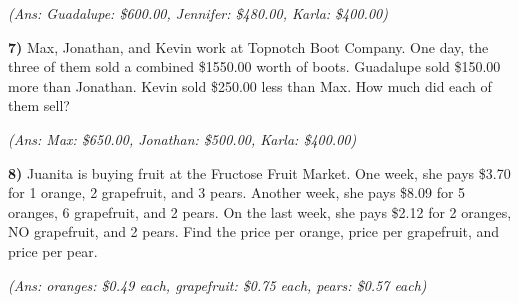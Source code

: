 \documentclass[10pt,letterpaper]{memoir}
\begin{document}
\myWideMatrixTable[-0.1in]

\vspace{0.5in}
\hfill{\itshape (Ans: Guadalupe: \$600.00, Jennifer: \$480.00, Karla: \$400.00)}
\vspace{2em}



\newpage
{\bfseries\large 7)} 
Max, Jonathan, and Kevin work at Topnotch Boot Company.
One day, the three of them sold a combined \$1550.00 worth of boots.
Guadalupe sold \$150.00 more than Jonathan.
Kevin sold \$250.00 less than Max.
How much did each of them sell?

\myWideMatrixTable[-0.1in]

\vspace{0.5in}
\hfill{\itshape (Ans: Max: \$650.00, Jonathan: \$500.00, Karla: \$400.00)}
\vspace{2em}





{\bfseries\large 8)} 
Juanita is buying fruit at the Fructose Fruit Market.
One week, she pays \$3.70 for 1 orange, 2 grapefruit, and 3 pears.
Another week, she pays \$8.09 for 5 oranges, 6 grapefruit, and 2 pears.
On the last week, she pays \$2.12 for 2 oranges, NO grapefruit, and 2 pears.
Find the price per orange, price per grapefruit, and price per pear.


\myWideMatrixTable[-0.1in]

\vspace{0.5in}
\hfill{\itshape (Ans: oranges: \$0.49 each, grapefruit: \$0.75 each, pears: \$0.57 each)}
\vspace{2em}
\end{document}
